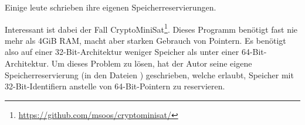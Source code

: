 Einige leute schrieben ihre eigenen Speicherreservierungen.

Interessant ist dabei der Fall CryptoMiniSat\footnote{\url{https://github.com/msoos/cryptominisat/}}.
Dieses Programm benötigt fast nie mehr als 4GiB \ac{RAM}, macht aber starken Gebrauch von Pointern.
Es benötigt also auf einer 32-Bit-Architektur weniger Speicher als unter einer 64-Bit-Architektur.
Um dieses Problem zu lösen, hat der Autor seine eigene Speicherreservierung (in den Dateien
) geschrieben, welche erlaubt, Speicher mit 32-Bit-Identifiern anstelle von 64-Bit-Pointern
zu reservieren.

